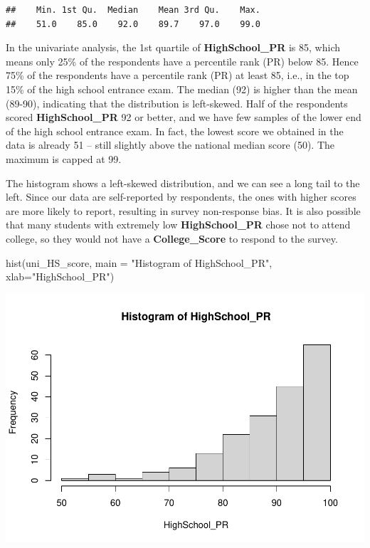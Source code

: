 \documentclass[
]{article}
\newenvironment{Shaded}{\begin{snugshade}}{\end{snugshade}}
\newcommand{\AttributeTok}[1]{\textcolor[rgb]{0.77,0.63,0.00}{#1}}
\newcommand{\FunctionTok}[1]{\textcolor[rgb]{0.00,0.00,0.00}{#1}}
\newcommand{\NormalTok}[1]{#1}
\newcommand{\SpecialCharTok}[1]{\textcolor[rgb]{0.00,0.00,0.00}{#1}}
\newcommand{\StringTok}[1]{\textcolor[rgb]{0.31,0.60,0.02}{#1}}
\begin{document}
\begin{Shaded}
\end{Shaded}

\begin{verbatim}
##    Min. 1st Qu.  Median    Mean 3rd Qu.    Max. 
##    51.0    85.0    92.0    89.7    97.0    99.0
\end{verbatim}

In the univariate analysis, the 1st quartile of \textbf{HighSchool\_PR}
is 85, which means only 25\% of the respondents have a percentile rank
(PR) below 85. Hence 75\% of the respondents have a percentile rank (PR)
at least 85, i.e., in the top 15\% of the high school entrance exam. The
median (92) is higher than the mean (89-90), indicating that the
distribution is left-skewed. Half of the respondents scored
\textbf{HighSchool\_PR} 92 or better, and we have few samples of the
lower end of the high school entrance exam. In fact, the lowest score we
obtained in the data is already 51 -- still slightly above the national
median score (50). The maximum is capped at 99.

The histogram shows a left-skewed distribution, and we can see a long
tail to the left. Since our data are self-reported by respondents, the
ones with higher scores are more likely to report, resulting in survey
non-response bias. It is also possible that many students with extremely
low \textbf{HighSchool\_PR} chose not to attend college, so they would
not have a \textbf{College\_Score} to respond to the survey.

\begin{Shaded}
\begin{Highlighting}[]
\FunctionTok{hist}\NormalTok{(uni\_HS\_score, }\AttributeTok{main =} \StringTok{"Histogram of HighSchool\_PR"}\NormalTok{, }\AttributeTok{xlab=}\StringTok{"HighSchool\_PR"}\NormalTok{)}
\end{Highlighting}
\end{Shaded}

\includegraphics{PTT_Analysis_of_Test_Scores_Unfinished_files/figure-latex/high-school-pr-histogram-1.pdf}
\end{document}
